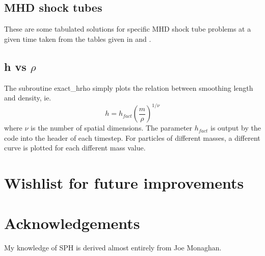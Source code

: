 \documentclass[a4paper,12pt]{article}
\begin{document}
\subsection{MHD shock tubes}
 These are some tabulated solutions for specific MHD shock tube problems at a
given time taken from the tables given in \citet{dw94} and \citet{rj95}.

\subsection{h vs $\rho$}
 The subroutine exact\_hrho simply plots the relation between smoothing length
and density, ie.
\begin{equation}
h = h_{fact} \left(\frac{m}{\rho}\right)^{1/\nu}
\end{equation}
where $\nu$ is the number of spatial dimensions. The parameter $h_{fact}$ is
output by the code into the header of each timestep. For particles of different
masses, a different curve is plotted for each different mass value.

\section{Wishlist for future improvements}

\section*{Acknowledgements}
 My knowledge of SPH is derived almost entirely from Joe Monaghan.



\end{document}
